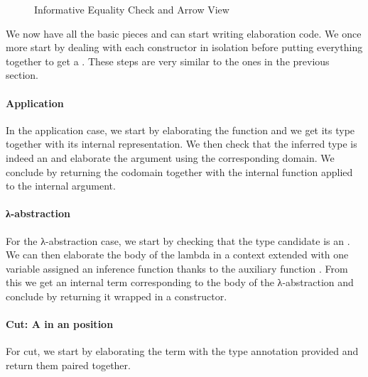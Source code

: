\begin{figure}[h]
\begin{minipage}[t]{0.45\textwidth}
\end{minipage}
\begin{minipage}[t]{0.45\textwidth}
\end{minipage}
\caption{Informative Equality Check and Arrow View\label{fig:informativecheck}}
\end{figure}

We now have all the basic pieces and can start writing elaboration code. We
once more start by dealing with each constructor in isolation before putting
everything together to get a . These steps are very similar to
the ones in the previous section.

\paragraph{Application} In the application case, we start by elaborating the
function and we get its type together with its internal representation. We then
check that the inferred type is indeed an  and elaborate the argument
using the corresponding domain. We conclude by returning the codomain together
with the internal function applied to the internal argument.
\begin{agdasnippet}
\end{agdasnippet}
\paragraph{λ-abstraction} For the λ-abstraction case, we start by checking that
the type candidate is an . We can then elaborate the body of the lambda
in a context extended with one  variable assigned an inference function
thanks to the auxiliary function . From this we get an internal term
corresponding to the body of the λ-abstraction and conclude by returning it wrapped
in a  constructor.
\begin{agdasnippet}
\end{agdasnippet}
\paragraph{Cut: A  in an  position} For cut, we start by
elaborating the term with the type annotation provided and return them paired
together.
\begin{agdasnippet}
\end{agdasnippet}
